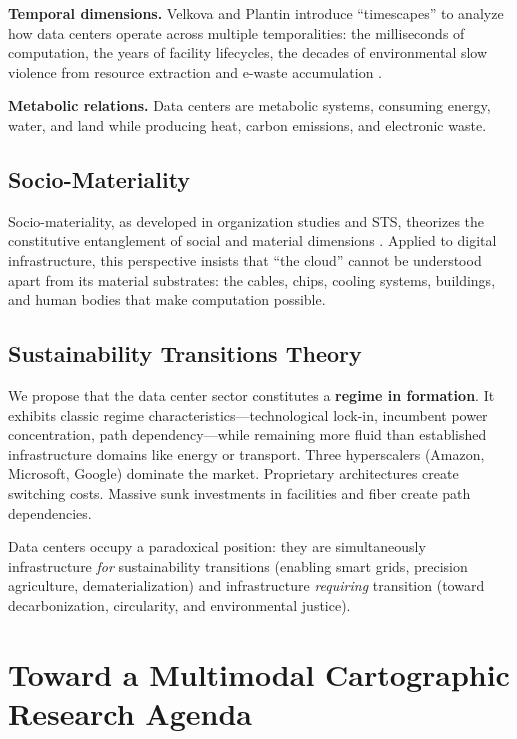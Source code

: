 \documentclass[../../main.tex]{subfiles}
\begin{document}
\textbf{Temporal dimensions.} Velkova and Plantin introduce ``timescapes'' to analyze how data centers operate across multiple temporalities: the milliseconds of computation, the years of facility lifecycles, the decades of environmental slow violence from resource extraction and e-waste accumulation .

\textbf{Metabolic relations.} Data centers are metabolic systems, consuming energy, water, and land while producing heat, carbon emissions, and electronic waste.

\subsection{Socio-Materiality}

Socio-materiality, as developed in organization studies and STS, theorizes the constitutive entanglement of social and material dimensions . Applied to digital infrastructure, this perspective insists that ``the cloud'' cannot be understood apart from its material substrates: the cables, chips, cooling systems, buildings, and human bodies that make computation possible.

\subsection{Sustainability Transitions Theory}

We propose that the data center sector constitutes a \textbf{regime in formation}. It exhibits classic regime characteristics---technological lock-in, incumbent power concentration, path dependency---while remaining more fluid than established infrastructure domains like energy or transport. Three hyperscalers (Amazon, Microsoft, Google) dominate the market. Proprietary architectures create switching costs. Massive sunk investments in facilities and fiber create path dependencies.

\begin{kaobox}[title=The Dual Role of Data Centers]
Data centers occupy a paradoxical position: they are simultaneously infrastructure \textit{for} sustainability transitions (enabling smart grids, precision agriculture, dematerialization) and infrastructure \textit{requiring} transition (toward decarbonization, circularity, and environmental justice).
\end{kaobox}

\section{Toward a Multimodal Cartographic Research Agenda}
\end{document}
